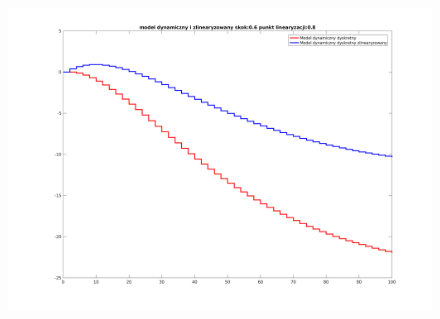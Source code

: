 \documentclass[a4paper, 11pt]{article}
\begin{document}
\begin{figure}[H]
\centering
\includegraphics[scale=0.45]{968.png}
\end{figure}
\end{document}
